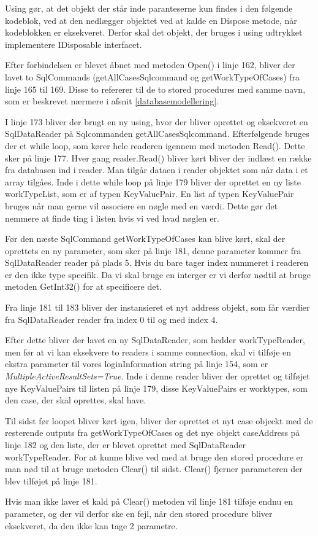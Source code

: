 Using gør, at det objekt der står inde paranteserne kun findes i den følgende kodeblok, ved at den nedlægger objektet ved at kalde en Dispose metode, når kodeblokken er eksekveret.
Derfor skal det objekt, der bruges i using udtrykket implementere IDisposable interfacet.\cite{using}

Efter forbindelsen er blevet åbnet med metoden Open() i linje 162, bliver der lavet to SqlCommands (getAllCasesSqlcommand og getWorkTypeOfCases) fra linje 165 til 169.
Disse to refererer til de to stored procedures med samme navn, som er beskrevet nærmere i afsnit \ref{databasemodellering}.

I linje 173 bliver der brugt en ny using, hvor der bliver oprettet og eksekveret en SqlDataReader på Sqlcommanden getAllCasesSqlcommand.
Efterfølgende bruges der et while loop, som kører hele readeren igennem med metoden Read().
Dette sker på linje 177.
Hver gang reader.Read() bliver kørt bliver der indlæst en række fra databasen ind i reader.
Man tilgår dataen i reader objektet som når data i et array tilgåes.
Inde i dette while loop på linje 179 bliver der oprettet en ny liste workTypeList, som er af typen KeyValuePair.
En list af typen KeyValuePair bruges når man gerne vil associere en nøgle med en værdi.
Dette gør det nemmere at finde ting i listen hvis vi ved hvad nøglen er.

Før den næste SqlCommand getWorkTypeOfCases kan blive kørt, skal der oprettets en ny parameter, som sker på linje 181, denne parameter kommer fra SqlDataReader reader på plads 5.
Hvis du bare tager index nummeret i readeren er den ikke type specifik.
Da vi skal bruge en interger er vi derfor nødtil at bruge metoden GetInt32() for at specificere det.\cite{sqlreader}

Fra linje 181 til 183 bliver der instansieret et nyt address objekt, som får værdier fra SqlDataReader reader fra index 0 til og med index 4.

Efter dette bliver der lavet en ny SqlDataReader, som hedder workTypeReader, men før at vi kan eksekvere to readers i samme connection, skal vi tilføje en ekstra parameter til vores loginInformation string på linje 154, som er \textit{MultipleActiveResultSets=True}.
Inde i denne reader bliver der oprettet og tilføjet nye KeyValuePairs til listen på linje 179, disse KeyValuePairs er worktypes, som den case, der skal oprettes, skal have.

Til sidst før loopet bliver kørt igen, bliver der oprettet et nyt case objeckt med de resterende outputs fra getWorkTypeOfCases og det nye objekt caseAddress på linje 182 og den liste, der er blevet oprettet med SqlDataReader workTypeReader.
For at kunne blive ved med at bruge den stored procedure er man nød til at bruge metoden Clear() til sidst.
Clear() fjerner parameteren der blev tilføjet på linje 181.

Hvis man ikke laver et kald på Clear() metoden vil linje 181 tilføje endnu en parameter, og der vil derfor ske en fejl, når den stored procedure bliver eksekveret, da den ikke kan tage 2 parametre.
